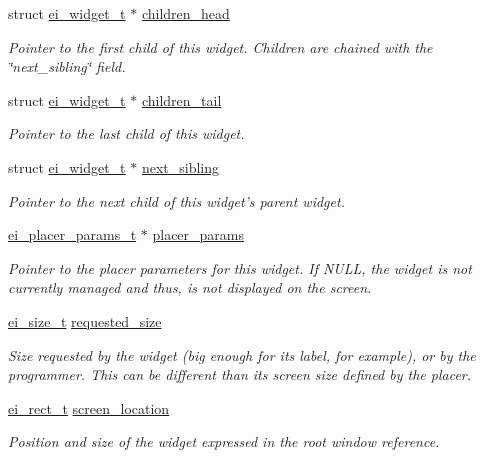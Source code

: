 \begin{DoxyCompactItemize}
struct \hyperlink{structei__widget__t}{ei\-\_\-widget\-\_\-t} $\ast$ \hyperlink{structei__widget__t_a190316f0ec41d2d98b919414c860f828}{children\-\_\-head}
\begin{DoxyCompactList}\small\item\em Pointer to the first child of this widget. Children are chained with the \char`\"{}next\-\_\-sibling\char`\"{} field. \end{DoxyCompactList}\item 
struct \hyperlink{structei__widget__t}{ei\-\_\-widget\-\_\-t} $\ast$ \hyperlink{structei__widget__t_aece2f3059f252538ae787857e7eea2a2}{children\-\_\-tail}
\begin{DoxyCompactList}\small\item\em Pointer to the last child of this widget. \end{DoxyCompactList}\item 
struct \hyperlink{structei__widget__t}{ei\-\_\-widget\-\_\-t} $\ast$ \hyperlink{structei__widget__t_ada15cedaf8e6e104a1461c1754ff6cb3}{next\-\_\-sibling}
\begin{DoxyCompactList}\small\item\em Pointer to the next child of this widget's parent widget. \end{DoxyCompactList}\item 
\hyperlink{structei__placer__params__t}{ei\-\_\-placer\-\_\-params\-\_\-t} $\ast$ \hyperlink{structei__widget__t_a82c675bf68aa3fa5b14b1f20bd157897}{placer\-\_\-params}
\begin{DoxyCompactList}\small\item\em Pointer to the placer parameters for this widget. If N\-U\-L\-L, the widget is not currently managed and thus, is not displayed on the screen. \end{DoxyCompactList}\item 
\hyperlink{structei__size__t}{ei\-\_\-size\-\_\-t} \hyperlink{structei__widget__t_ae82b19958b3ec72a855986dffb9b92ea}{requested\-\_\-size}
\begin{DoxyCompactList}\small\item\em Size requested by the widget (big enough for its label, for example), or by the programmer. This can be different than its screen size defined by the placer. \end{DoxyCompactList}\item 
\hyperlink{structei__rect__t}{ei\-\_\-rect\-\_\-t} \hyperlink{structei__widget__t_ad139e1541329b54e0b4c8d746e14b204}{screen\-\_\-location}
\begin{DoxyCompactList}\small\item\em Position and size of the widget expressed in the root window reference. \end{DoxyCompactList}\item 

\end{DoxyCompactItemize}
